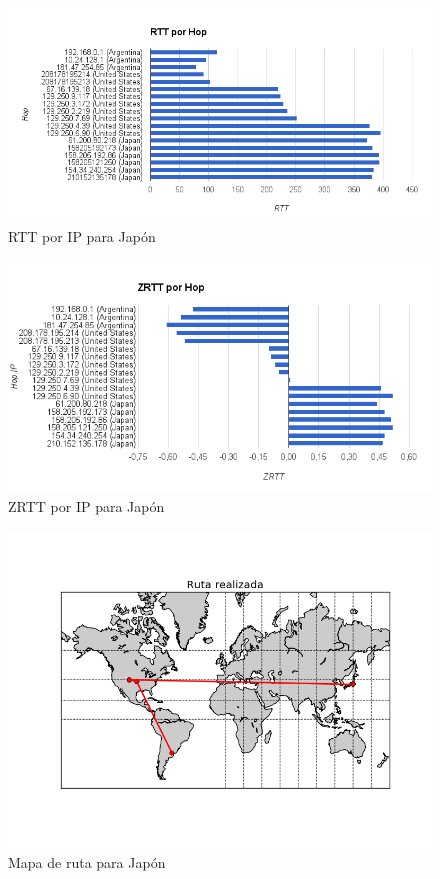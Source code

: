 \begin{figure}[H]
  \centering
    \includegraphics[width=1\textwidth]{../Experimentacion/Tokyo/rtt.png}
    \caption{RTT por IP para Japón}
  \label{rtt-tok}
\end{figure}

\begin{figure}[H]
  \centering
    \includegraphics[width=1\textwidth]{../Experimentacion/Tokyo/zrtt.png}
    \caption{ZRTT por IP para Japón}
  \label{zrtt-tok}
\end{figure}

\begin{figure}[H]
  \centering
    \includegraphics[width=1\textwidth]{../Experimentacion/Tokyo/map.png}
    \caption{Mapa de ruta para Japón}
  \label{map-tok}
\end{figure}


